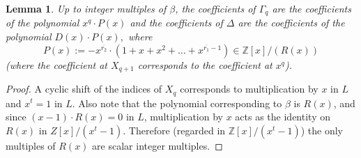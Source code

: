 \documentclass[12pt,a4paper]{article}
\newtheorem{lemma}[theorem]{Lemma}
\theoremstyle{definition}
\newcommand{\Z}{\mathbb{Z}}
\newcommand{\uo}{\overline{r_2}}
\newcommand{\vo}{\overline{r_1}}
\begin{document}
\begin{lemma}
Up to integer multiples of $\beta$, the coefficients of $\Gamma_q$ are the coefficients of the polynomial $x^q\cdot P(x)$ and the coefficients of $\Delta$ are the coefficients of the polynomial $D(x)\cdot P(x),$ where
$$P(x):=-x^{\uo}\cdot (1+x+x^2+\dots+x^{\vo-1})\in \Z[x]/(R(x))$$
(where the coefficient at $X_{q+1}$ corresponds to the coefficient at $x^q$).
\end{lemma}
\begin{proof}
A cyclic shift of the indices of $X_q$ corresponds to multiplication by $x$ in $L$ and $x^t=1$ in $L$. Also note that the polynomial corresponding to $\beta$ is $R(x)$, and since $(x-1)\cdot R(x)=0$ in $L$, multiplication by $x$ acts as the identity on $R(x)$ in $Z[x]/(x^t-1)$. Therefore (regarded in $\Z[x]/(x^t-1)$) the only multiples of $R(x)$ are scalar integer multiples.


\end{proof}
\end{document}
